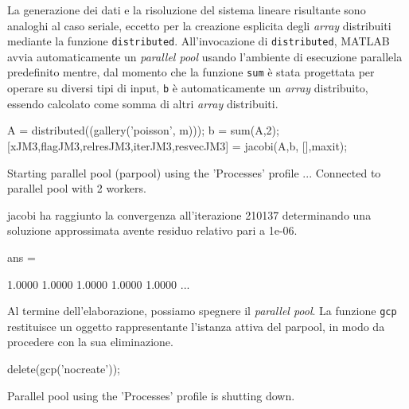 La generazione dei dati e la risoluzione del sistema lineare risultante sono analoghi al caso seriale, eccetto per la creazione esplicita degli \textit{array}
distribuiti mediante la funzione \lstinline{distributed}.\newline
All'invocazione di \lstinline{distributed}, MATLAB avvia automaticamente un \textit{parallel pool} usando l'ambiente di esecuzione parallela predefinito mentre, dal momento che la funzione \lstinline{sum} \`e stata progettata per operare su diversi tipi di input, \lstinline{b} \`e automaticamente un \textit{array} distribuito, essendo
calcolato come somma di altri \textit{array} distribuiti.
\begin{matlabcode}
    A = distributed((gallery('poisson', m)));
    b = sum(A,2);
    [xJM3,flagJM3,relresJM3,iterJM3,resvecJM3] = jacobi(A,b,
                                                 [],maxit);
\end{matlabcode}
\begin{matlaboutput}
    Starting parallel pool (parpool) using the 'Processes' 
    profile ...
    Connected to parallel pool with 2 workers.

    jacobi ha raggiunto la convergenza all'iterazione 210137
    determinando una soluzione approssimata avente residuo
    relativo pari a 1e-06.
\end{matlaboutput}
\begin{matlaboutput}
    ans =

    1.0000    1.0000    1.0000    1.0000    1.0000    ...
\end{matlaboutput}
Al termine dell'elaborazione, possiamo spegnere il \textit{parallel pool}. La funzione \lstinline{gcp} restituisce un oggetto rappresentante l'istanza attiva del parpool, in modo da procedere con la sua eliminazione.
\begin{matlabcode}
    delete(gcp('nocreate'));
\end{matlabcode}
\begin{matlaboutput}
    Parallel pool using the 'Processes' profile is shutting down.
\end{matlaboutput}
